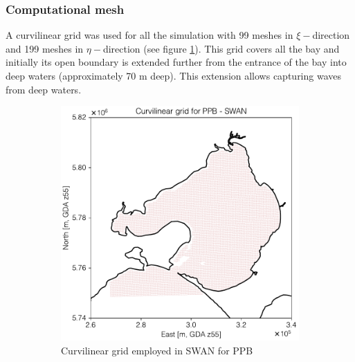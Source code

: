 \documentclass[12pt]{article}
\begin{document}
\subsubsection{Computational mesh}

A curvilinear grid was used for all the simulation with 99 meshes in $\xi-$direction and 199 meshes in $\eta-$direction (see figure \ref{fig:grid_PPB}). This grid covers all the bay and initially its open boundary is extended further from the entrance of the bay into deep waters (approximately 70 m deep). This extension allows capturing waves from deep waters.

\begin{figure}[h]
\centering
\begin{subfigure}{.5\textwidth}
  \centering
  \includegraphics[scale=0.55]{plots/maps/grid_SWAN.pdf}
  \caption{Curvilinear grid employed in SWAN for PPB}
  \label{fig:grid_PPB}
\end{subfigure}%
\begin{subfigure}{.5\textwidth}
  \centering

\end{subfigure}
\end{figure}
\end{document}
